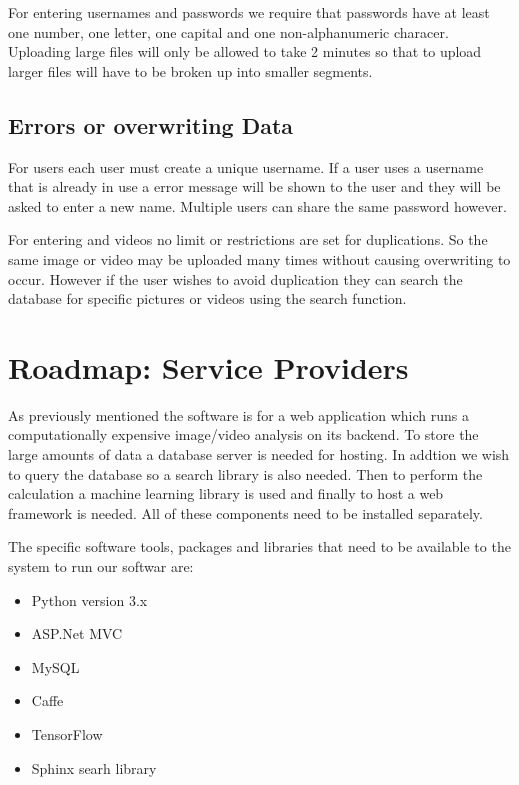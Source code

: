 \documentclass{scrreprt}
\begin{document}
For entering usernames and passwords we require that passwords have at least one number, one letter, one capital and one non-alphanumeric characer.  Uploading large files will only be allowed to take 2 minutes so that to upload larger files will have to be broken up into smaller segments.


\subsection{Errors or overwriting Data}

For users each user must create a unique username.  If a user uses a username that is already in use a error message will be shown to the user and they will be asked to enter a new name.  Multiple users can share the same password however.

For entering and videos no limit or restrictions are set for duplications.  So the same image or video may be uploaded many times without causing overwriting to occur.  However if the user wishes to avoid duplication they can search the database for specific pictures or videos using the search function.


\section{Roadmap: Service Providers}

As previously mentioned the software is for a  web application which runs a computationally expensive image/video analysis on its backend. To store the large amounts of data a database server is needed for hosting.  In addtion we wish to query the database so a search library is also needed. Then to perform the calculation a machine learning library is used and finally to host a web framework is needed. All of these components need to be installed separately.

The specific software tools, packages and libraries that need to be available to the system to run our softwar are:

\begin{itemize}
  \item Python version 3.x
  \item ASP.Net MVC
  \item MySQL
  \item Caffe
  \item TensorFlow
  \item Sphinx searh library
\end{itemize}
\end{document}
